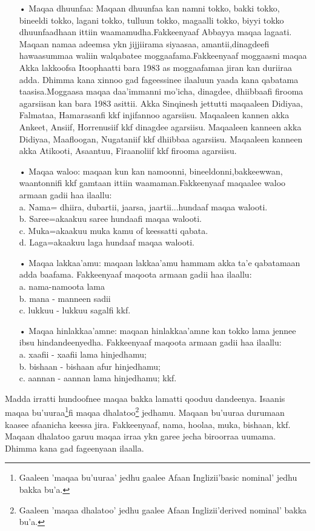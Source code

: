 \documentclass[11pt,b5paper]{book}
\begin{document}
\begin{itemize}
\item[•] Maqaa dhuunfaa: Maqaan dhuunfaa kan namni tokko, bakki tokko, bineeldi tokko, lagani tokko, tulluun tokko, magaalli tokko, biyyi tokko dhuunfaadhaan ittiin waamamudha.Fakkeenyaaf Abbayya maqaa lagaati. Maqaan namaa adeemsa ykn jijjiirama siyaasaa, amantii,dinagdeefi hawaasummaa waliin walqabatee moggaafama.Fakkeenyaaf moggaasni maqaa Akka lakkoofsa Itoophaatti bara 1983 as moggaafamaa jiran kan duriiraa adda\cite{sinqinash2018}. Dhimma kana xinnoo gad fageessinee ilaaluun yaada kana qabatama taasisa.Moggaasa maqaa daa’immanni mo’icha, dinagdee, dhiibbaafi firooma agarsiisan kan bara 1983 asittii\cite{sinqinash2018}. Akka Sinqinesh jettutti maqaaleen Didiyaa, Falmataa, Hamarasanfi kkf injifannoo agarsiisu. Maqaaleen kannen akka Ankeet, Ansiif, Horrenusiif kkf dinagdee agarsiisu. Maqaaleen kanneen akka Didiyaa, Maafloogan, Nugataniif kkf dhiibbaa agarsiisu. Maqaaleen kanneen akka Atikooti, Asaantuu, Firaanoliif kkf firooma agarsiisu.

\item[•] Maqaa waloo: maqaan kun kan namoonni, bineeldonni,bakkeewwan, waantonnifi kkf gamtaan ittiin waamaman.Fakkeenyaaf maqaalee waloo armaan gadii haa ilaallu:\\
a. Nama= dhiira, dubartii, jaarsa, jaartii...hundaaf maqaa walooti.\\
b. Saree=akaakuu saree hundaafi maqaa walooti.\\
c. Muka=akaakuu muka kamu of keessatti qabata.\\
d. Laga=akaakuu laga hundaaf maqaa walooti.

\item[•] Maqaa lakkaa’amu: maqaan lakkaa'amu hammam akka ta'e qabatamaan adda baafama. Fakkeenyaaf maqoota armaan gadii haa ilaallu:\\
a. nama-namoota lama\\
b. mana - manneen sadii\\
c. lukkuu - lukkuu sagalfi kkf.

\item[•] Maqaa hinlakkaa’amne: maqaan hinlakkaa'amne kan tokko lama jennee ibsu hindandeenyedha. Fakkeenyaaf maqoota armaan gadii haa ilaallu:\\
a. xaafii - xaafii lama hinjedhamu;\\
b. bishaan - bishaan afur hinjedhamu;\\
c. aannan - aannan lama hinjedhamu; kkf.
\end{itemize}

Madda irratti hundoofnee maqaa bakka lamatti qooduu dandeenya. Isaanis maqaa bu'uuraa\footnote{Gaaleen 'maqaa bu'uuraa' jedhu gaalee Afaan Inglizii'basic nominal' jedhu bakka bu'a.}fi maqaa dhalatoo\footnote{Gaaleen 'maqaa dhalatoo' jedhu gaalee Afaan Inglizii'derived nominal' bakka bu'a.} jedhamu. Maqaan bu’uuraa durumaan kaasee afaanicha keessa jira. Fakkeenyaaf, nama, hoolaa, muka, bishaan, kkf. Maqaan dhalatoo garuu maqaa irraa ykn garee jecha biroorraa uumama. Dhimma kana gad fageenyaan ilaalla.
\end{document}

